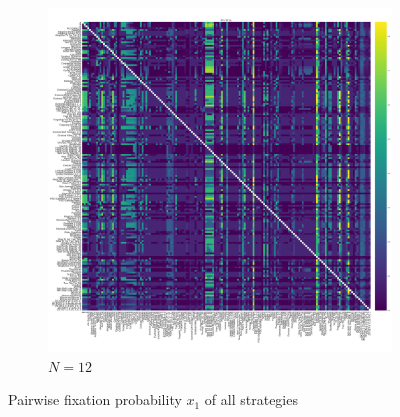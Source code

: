 \documentclass{article}
\begin{document}
\begin{figure}[!hbtp]
    \begin{subfigure}[t]{.3\textwidth}
        \centering
        \includegraphics[width=.8\textwidth]{./img/fixation_heatmap_12_invade.pdf}
        \caption{\(N=12\)}

    \end{subfigure}%

    \caption{Pairwise fixation probability \(x_{1}\) of all strategies}
    \label{fig:fixation_heatmap_invade}
\end{figure}
\end{document}
